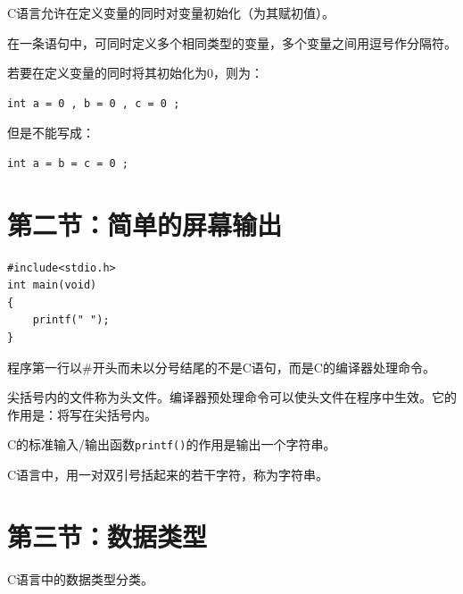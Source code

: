 C语言允许在定义变量的同时对变量初始化（为其赋初值）。

在一条语句中，可同时定义多个相同类型的变量，多个变量之间用逗号作分隔符。

若要在定义变量的同时将其初始化为0，则为：
\begin{lstlisting}
int a = 0 , b = 0 , c = 0 ;
\end{lstlisting}

但是不能写成：
\begin{lstlisting}
int a = b = c = 0 ;
\end{lstlisting}


\section{第二节：简单的屏幕输出}
\begin{lstlisting}
#include<stdio.h>
int main(void)
{
	printf(" ");
}
\end{lstlisting}

程序第一行以\#开头而未以分号结尾的不是C语句，而是C的编译器处理命令。

尖括号内的文件称为头文件。编译器预处理命令可以使头文件在程序中生效。它的作用是：将写在尖括号内。

C的标准输入/输出函数\texttt{printf()}的作用是输出一个字符串。

C语言中，用一对双引号括起来的若干字符，称为字符串。


\section{第三节：数据类型}
C语言中的数据类型分类。

